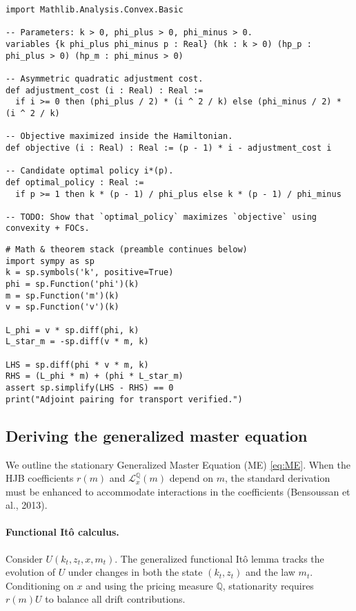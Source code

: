 \documentclass[11pt,letterpaper,oneside]{article}
\newcommand{\LxQ}{\mathcal{L}_x^{\mathbb{Q}}}
\begin{document}
\begin{tcolorbox}[leanproofstyle,title={Formalization: Optimization structure in Lean~4}]
\begin{verbatim}
import Mathlib.Analysis.Convex.Basic

-- Parameters: k > 0, phi_plus > 0, phi_minus > 0.
variables {k phi_plus phi_minus p : Real} (hk : k > 0) (hp_p : phi_plus > 0) (hp_m : phi_minus > 0)

-- Asymmetric quadratic adjustment cost.
def adjustment_cost (i : Real) : Real :=
  if i >= 0 then (phi_plus / 2) * (i ^ 2 / k) else (phi_minus / 2) * (i ^ 2 / k)

-- Objective maximized inside the Hamiltonian.
def objective (i : Real) : Real := (p - 1) * i - adjustment_cost i

-- Candidate optimal policy i*(p).
def optimal_policy : Real :=
  if p >= 1 then k * (p - 1) / phi_plus else k * (p - 1) / phi_minus

-- TODO: Show that `optimal_policy` maximizes `objective` using convexity + FOCs.
\end{verbatim}
\begin{verbatim}
# Math & theorem stack (preamble continues below)
import sympy as sp
k = sp.symbols('k', positive=True)
phi = sp.Function('phi')(k)
m = sp.Function('m')(k)
v = sp.Function('v')(k)

L_phi = v * sp.diff(phi, k)
L_star_m = -sp.diff(v * m, k)

LHS = sp.diff(phi * v * m, k)
RHS = (L_phi * m) + (phi * L_star_m)
assert sp.simplify(LHS - RHS) == 0
print("Adjoint pairing for transport verified.")
\end{verbatim}
\end{tcolorbox}

\subsection{Deriving the generalized master equation}\label{app:me_derivation}

We outline the stationary Generalized Master Equation (ME) \eqref{eq:ME}. When the HJB coefficients $r(m)$ and $\LxQ(m)$ depend on $m$, the standard derivation must be enhanced to accommodate interactions in the coefficients (Bensoussan et al., 2013).

\paragraph{Functional It\^o calculus.}
Consider $U(k_t,z_t,x,m_t)$. The generalized functional It\^o lemma tracks the evolution of $U$ under changes in both the state $(k_t,z_t)$ and the law $m_t$. Conditioning on $x$ and using the pricing measure $\mathbb{Q}$, stationarity requires $r(m)U$ to balance all drift contributions.
\end{document}
